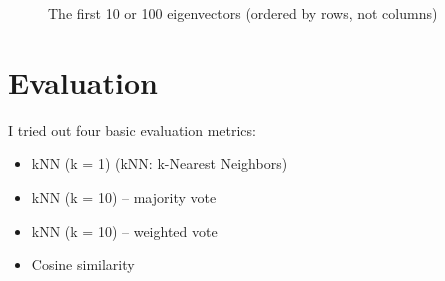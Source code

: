 \documentclass[11pt]{report}
\begin{document}
\begin{figure}[h]
  \centering
  \caption{The first 10 or 100 eigenvectors (ordered by rows, not columns)}
  \label{fig:100eigenvectors}
\end{figure}

\section{Evaluation}

I tried out four basic evaluation metrics:

\begin{itemize}
  \item kNN (k = 1) \hfill (kNN: k-Nearest Neighbors)
  \item kNN (k = 10) -- majority vote
  \item kNN (k = 10) -- weighted vote
  \item Cosine similarity
\end{itemize}
\end{document}
